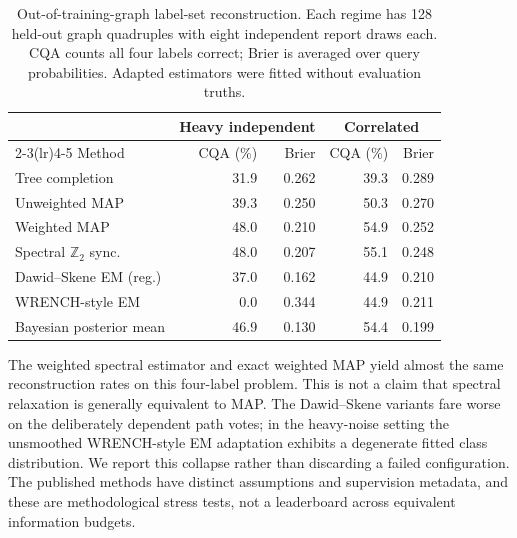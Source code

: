 \documentclass[10pt]{article}
\begin{document}
\begin{table}[H]
\centering\small
\caption{Out-of-training-graph label-set reconstruction. Each regime has 128 held-out graph quadruples with eight independent report draws each. CQA counts all four labels correct; Brier is averaged over query probabilities. Adapted estimators were fitted without evaluation truths.}
\label{tab:published_label}
\begin{tabular}{lrrrr}
\toprule
& \multicolumn{2}{c}{Heavy independent} & \multicolumn{2}{c}{Correlated} \\
\cmidrule(lr){2-3}\cmidrule(lr){4-5}
Method & CQA (\%) & Brier & CQA (\%) & Brier \\
\midrule
Tree completion & 31.9 & 0.262 & 39.3 & 0.289 \\
Unweighted MAP & 39.3 & 0.250 & 50.3 & 0.270 \\
Weighted MAP & 48.0 & 0.210 & 54.9 & 0.252 \\
Spectral $\mathbb{Z}_2$ sync. & 48.0 & 0.207 & 55.1 & 0.248 \\
Dawid--Skene EM (reg.) & 37.0 & 0.162 & 44.9 & 0.210 \\
WRENCH-style EM & 0.0 & 0.344 & 44.9 & 0.211 \\
Bayesian posterior mean & 46.9 & 0.130 & 54.4 & 0.199 \\
\bottomrule
\end{tabular}
\end{table}

The weighted spectral estimator and exact weighted MAP yield almost the same reconstruction rates on this four-label problem. This is not a claim that spectral relaxation is generally equivalent to MAP. The Dawid--Skene variants fare worse on the deliberately dependent path votes; in the heavy-noise setting the unsmoothed WRENCH-style EM adaptation exhibits a degenerate fitted class distribution. We report this collapse rather than discarding a failed configuration. The published methods have distinct assumptions and supervision metadata, and these are methodological stress tests, not a leaderboard across equivalent information budgets.
\end{document}
